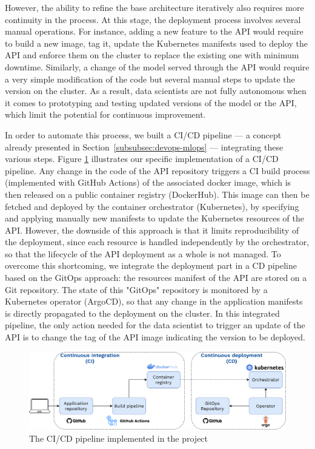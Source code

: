 \documentclass[graybox]{svmult}
\begin{document}
However, the ability to refine the base architecture iteratively also requires more continuity in the process. At this stage, the deployment process involves several manual operations. For instance, adding a new feature to the API would require to build a new image, tag it, update the Kubernetes manifests used to deploy the API and enforce them on the cluster to replace the existing one with minimum downtime. Similarly, a change of the model served through the API would require a very simple modification of the code but several manual steps to update the version on the cluster. As a result, data scientists are not fully autonomous when it comes to prototyping and testing updated versions of the model or the API, which limit the potential for continuous improvement.

In order to automate this process, we built a CI/CD pipeline — a concept already presented in Section~\ref{subsubsec:devops-mlops} — integrating these various steps. Figure \ref{fig:ci-cd} illustrates our specific implementation of a CI/CD pipeline. Any change in the code of the API repository triggers a CI build process (implemented with GitHub Actions) of the associated docker image, which is then released on a public container registry (DockerHub). This image can then be fetched and deployed by the container orchestrator (Kubernetes), by specifying and applying manually new manifests to update the Kubernetes resources of the API. However, the downside of this approach is that it limits reproducibility of the deployment, since each resource is handled independently by the orchestrator, so that the lifecycle of the API deployment as a whole is not managed. To overcome this shortcoming, we integrate the deployment part in a CD pipeline based on the GitOps approach: the resources manifest of the API are stored on a Git repository. The state of this "GitOps" repository is monitored by a Kubernetes operator (ArgoCD), so that any change in the application manifests is directly propagated to the deployment on the cluster. In this integrated pipeline, the only action needed for the data scientist to trigger an update of the API is to change the tag of the API image indicating the version to be deployed.

\begin{figure}[htbp]
    \centering
    \includegraphics[width=\textwidth]{figures/ci-cd.png}
    \caption{The CI/CD pipeline implemented in the project}
    \label{fig:ci-cd}
\end{figure}
\end{document}
